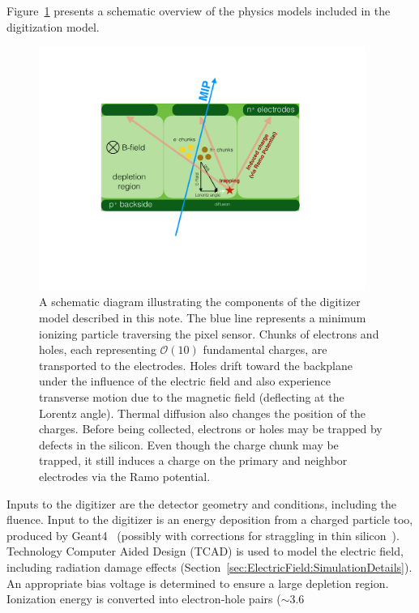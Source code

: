 Figure~\ref{fig:app:raddamge1} presents a schematic overview of the physics models included in the digitization model.   
\begin{figure}[htpb!]
\centering
\includegraphics[width=0.95\textwidth]{DigitizerSchematic}
\caption{A schematic diagram illustrating the components of the digitizer model described in this note.  The blue line represents a minimum ionizing particle traversing the pixel sensor.  Chunks of electrons and holes, each representing $\mathcal{O}(10)$ fundamental charges, are transported to the electrodes.  Holes drift toward the backplane under the influence of the electric field and also experience transverse motion due to the magnetic field (deflecting at the Lorentz angle).  Thermal diffusion also changes the position of the charges.  Before being collected, electrons or holes may be trapped by defects in the silicon.  Even though the charge chunk may be trapped, it still induces a charge on the primary and neighbor electrodes via the Ramo potential.  }
\label{fig:app:raddamge1}
\end{figure}
Inputs to the digitizer are the detector geometry and conditions, including the 
fluence.  Input to the digitizer is an energy deposition from a charged particle 
too, produced by Geant4~\cite{Agostinelli:2002hh} (possibly with corrections for straggling in thin 
silicon~\cite{Bichsel:1988if}).  Technology Computer Aided Design (TCAD) is used to model the electric 
field, including radiation damage effects (Section~\ref{sec:ElectricField:SimulationDetails}).  An 
appropriate bias voltage is determined to ensure a large depletion region.  Ionization energy is converted into electron-hole pairs ($\sim 3.6$ 
